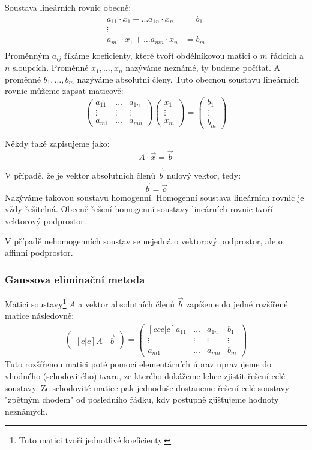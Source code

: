 Soustava lineárních rovnic obecně:
\begin{align*}
    a_{11} \cdot x_1 + \ldots a_{1n} \cdot x_n &= b_1\\
    \vdots\\
    a_{m1} \cdot x_1 + \ldots a_{mn} \cdot x_n &= b_m\\
\end{align*}
Proměnným $a_{ij}$ říkáme koeficienty, které tvoří obdélníkovou matici
o $m$ řádcích a $n$ sloupcích. Proměnné $x_1, \ldots, x_n$ nazýváme neznámé, ty budeme
počítat. A proměnné $b_1, \ldots, b_m$ nazýváme absolutní členy.
Tuto obecnou soustavu lineárních rovnic můžeme zapsat maticově:
\[
    \begin{pmatrix}
        a_{11} & \ldots & a_{1n} \\
        \vdots & \vdots & \vdots\\
        a_{m1} & \ldots & a_{mn}
    \end{pmatrix}
    \begin{pmatrix}
        x_1 \\
        \vdots \\
        x_m
    \end{pmatrix}
    =
    \begin{pmatrix}
        b_1 \\
        \vdots \\
        b_m
    \end{pmatrix}
\]

Někdy také zapisujeme jako:
$$A \cdot \vec{x} = \vec{b}$$

V případě, že je vektor absolutních členů $\vec{b}$ nulový vektor, tedy:
$$\vec{b} = \vec{o}$$
Nazýváme takovou soustavu homogenní. Homogenní soustava lineárních rovnic je vždy řešitelná.
Obecně řešení homogenní soustavy lineárních rovnic tvoří vektorový podprostor.

V případě nehomogenních soustav se nejedná o vektorový podprostor, ale o affinní podprostor.


\subsubsection{Gaussova eliminační metoda}
Matici soustavy\footnote{Tuto matici tvoří jednotlivé koeficienty.} $A$ a vektor absolutních členů
$\vec{b}$ zapíšeme do jedné rozšířené matice následovně:
\begin{align*}
    \begin{pmatrix}[c|c]
        A & \vec{b}
    \end{pmatrix} =
    \begin{pmatrix}[ccc|c]
        a_{11} & \ldots & a_{1n} & b_1\\
        \vdots & \vdots & \vdots & \vdots \\
        a_{m1} & \ldots & a_{mn} & b_m
    \end{pmatrix}
\end{align*}
Tuto rozšířenou matici poté pomocí elementárních úprav upravujeme do vhodného (schodovitého) tvaru,
ze kterého dokážeme lehce zjistit řešení celé soustavy. Ze schodovité matice pak jednoduše dostaneme
řešení celé soustavy "zpětným chodem" od posledního řádku, kdy postupně zjišťujeme hodnoty neznámých.

